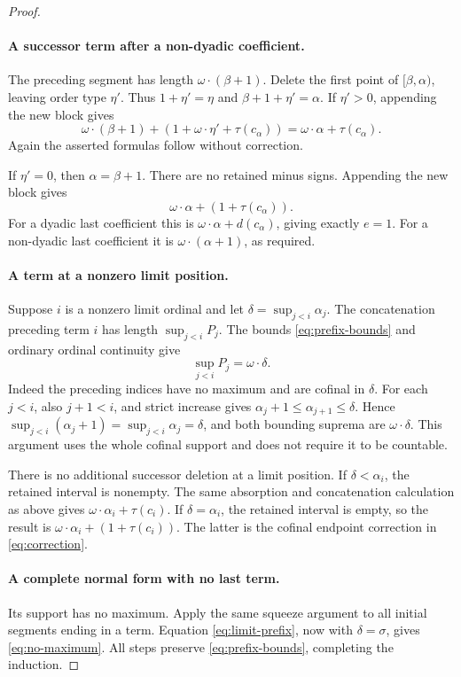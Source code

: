 \documentclass[11pt,letterpaper]{article}
\theoremstyle{definition}
\theoremstyle{remark}
\begin{document}
\begin{proof}
\paragraph{A successor term after a non-dyadic coefficient.}
The preceding segment has length \(\omega\cdot(\beta+1)\).
Delete the first point of \([\beta,\alpha)\), leaving order type
\(\eta'\). Thus \(1+\eta'=\eta\) and
\(\beta+1+\eta'=\alpha\).
If \(\eta'>0\), appending the new block gives
\[
 \omega\cdot(\beta+1)+(1+\omega\cdot\eta'+\tau(c_\alpha))
   =\omega\cdot\alpha+\tau(c_\alpha).
\]
Again the asserted formulas follow without correction.

If \(\eta'=0\), then \(\alpha=\beta+1\). There are no retained
minus signs. Appending the new block gives
\[
 \omega\cdot\alpha+(1+\tau(c_\alpha)).
\]
For a dyadic last coefficient this is
\(\omega\cdot\alpha+d(c_\alpha)\), giving exactly \(e=1\).
For a non-dyadic last coefficient it is
\(\omega\cdot(\alpha+1)\), as required.

\paragraph{A term at a nonzero limit position.}
Suppose \(i\) is a nonzero limit ordinal and let
\(\delta=\sup_{j<i}\alpha_j\). The concatenation preceding term \(i\)
has length \(\sup_{j<i}P_j\). The bounds
\eqref{eq:prefix-bounds} and ordinary ordinal continuity give
\begin{equation}\label{eq:limit-prefix}
 \sup_{j<i}P_j=\omega\cdot\delta.
\end{equation}
Indeed the preceding indices have no maximum and are cofinal in
\(\delta\). For each \(j<i\), also \(j+1<i\), and strict increase gives
\(\alpha_j+1\leq\alpha_{j+1}\leq\delta\). Hence
\(\sup_{j<i}(\alpha_j+1)=\sup_{j<i}\alpha_j=\delta\), and both
bounding suprema are \(\omega\cdot\delta\). This argument uses the
whole cofinal support and does not require it to be countable.

There is no additional successor deletion at a limit position. If
\(\delta<\alpha_i\), the retained interval is nonempty. The same
absorption and concatenation calculation as above gives
\(\omega\cdot\alpha_i+\tau(c_i)\). If \(\delta=\alpha_i\), the
retained interval is empty, so the result is
\(\omega\cdot\alpha_i+(1+\tau(c_i))\). The latter is the cofinal
endpoint correction in \eqref{eq:correction}.

\paragraph{A complete normal form with no last term.}
Its support has no maximum. Apply the same squeeze argument to all
initial segments ending in a term. Equation \eqref{eq:limit-prefix}, now
with \(\delta=\sigma\), gives \eqref{eq:no-maximum}.
All steps preserve \eqref{eq:prefix-bounds}, completing the induction.
\end{proof}
\end{document}
